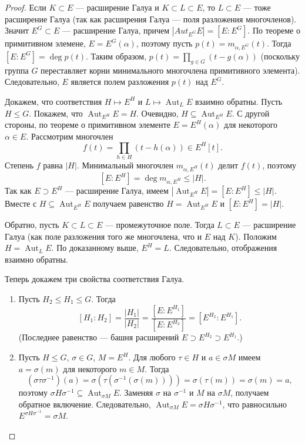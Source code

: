 \begin{proof}
    Если \(K \subset E\) --- расширение Галуа и \(K \subset L \subset E\), то \(L \subset E\) --- тоже расширение Галуа (так как расширения Галуа --- поля разложения многочленов). Значит \(E^G \subset E\) --- расширение Галуа, причем \(|Aut_{E^G}E| = [E:E^G]\). По теореме о примитивном элемене, \(E = E^G(\alpha)\), поэтому пусть \(p(t) = m_{\alpha, E^G}(t)\). Тогда \([E:E^G] = \deg p(t)\). Таким образом, \(p(t) = \prod_{g \in G} (t - g(\alpha))\) (поскольку группа \(G\) переставляет корни минимального многочлена примитивного элемента). Следовательно, \(E\) является полем разложения \(p(t)\) над \(E^G\).

    Докажем, что соответствия \(H \mapsto E^H\) и \(L \mapsto \operatorname{Aut}_L E\) взаимно обратны. Пусть \(H \le G\). Покажем, что \(\operatorname{Aut}_{E^H} E = H\). Очевидно, \(H \subseteq \operatorname{Aut}_{E^H} E\). С другой стороны, по теореме о примитивном элементе \(E = E^H(\alpha)\) для некоторого \(\alpha \in E\). Рассмотрим многочлен
    \[
    f(t) = \prod_{h \in H} (t - h(\alpha)) \in E^H[t].
    \]
    Степень \(f\) равна \(|H|\). Минимальный многочлен \(m_{\alpha, E^H}(t)\) делит \(f(t)\), поэтому
    \[
    [E : E^H] = \deg m_{\alpha, E^H} \le |H|.
    \]
    Так как \(E \supset E^H\) --- расширение Галуа, имеем \(|\operatorname{Aut}_{E^H} E| = [E : E^H] \le |H|\). Вместе с \(H \subseteq \operatorname{Aut}_{E^H} E\) получаем равенство \(H = \operatorname{Aut}_{E^H} E\) и \([E : E^H] = |H|\).

    Обратно, пусть \(K \subset L \subset E\) --- промежуточное поле. Тогда \(L \subset E\) --- расширение Галуа (как поле разложения того же многочлена, что и \(E\) над \(K\)). Положим \(H = \operatorname{Aut}_L E\). По доказанному выше, \(E^H = L\). Следовательно, отображения взаимно обратны. 

    Теперь докажем три свойства соответствия Галуа.

    \begin{enumerate}

        \item Пусть \(H_2 \le H_1 \le G\). Тогда
        \[
        [H_1 : H_2] = \frac{|H_1|}{|H_2|} = \frac{[E : E^{H_1}]}{[E : E^{H_2}]} = [E^{H_2} : E^{H_1}].
        \]
        (Последнее равенство --- башня расширений \(E \supset E^{H_2} \supset E^{H_1}\).)

        \item Пусть \(H \le G\), \(\sigma \in G\), \(M = E^H\). Для любого \(\tau \in H\) и \(a \in \sigma M\) имеем \(a = \sigma(m)\) для некоторого \(m \in M\). Тогда
        \[
        (\sigma \tau \sigma^{-1})(a) = \sigma(\tau(\sigma^{-1}(\sigma(m)))) = \sigma(\tau(m)) = \sigma(m) = a,
        \]
        поэтому \(\sigma H \sigma^{-1} \subseteq \operatorname{Aut}_{\sigma M} E\). Заменяя \(\sigma\) на \(\sigma^{-1}\) и \(M\) на \(\sigma M\), получаем обратное включение. Следовательно, \(\operatorname{Aut}_{\sigma M} E = \sigma H \sigma^{-1}\), что равносильно \(E^{\sigma H \sigma^{-1}} = \sigma M\).


\end{enumerate}
\end{proof}
